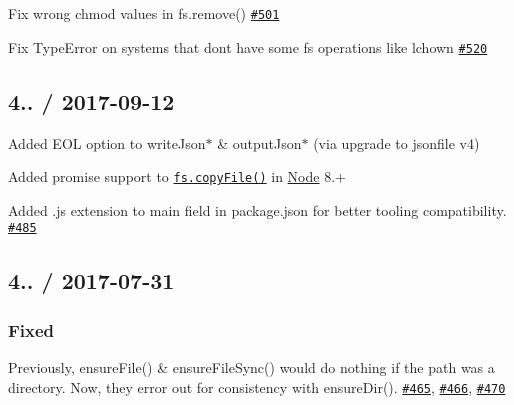 
\begin{DoxyItemize}
\item Fix wrong {\ttfamily chmod} values in {\ttfamily fs.\+remove()} \href{https://github.com/jprichardson/node-fs-extra/pull/501}{\tt \#501}
\item Fix {\ttfamily Type\+Error} on systems that don\textquotesingle{}t have some {\ttfamily fs} operations like {\ttfamily lchown} \href{https://github.com/jprichardson/node-fs-extra/pull/520}{\tt \#520}
\end{DoxyItemize}

\subsection*{4.. / 2017-\/09-\/12 }


\begin{DoxyItemize}
\item Added {\ttfamily E\+OL} option to {\ttfamily write\+Json$\ast$} \& {\ttfamily output\+Json$\ast$} (via upgrade to jsonfile v4)
\item Added promise support to \href{https://nodejs.org/api/fs.html#fs_fs_copyfile_src_dest_flags_callback}{\tt {\ttfamily fs.\+copy\+File()}} in \mbox{\hyperlink{classNode}{Node}} 8.+
\item Added {\ttfamily .js} extension to {\ttfamily main} field in {\ttfamily package.\+json} for better tooling compatibility. \href{https://github.com/jprichardson/node-fs-extra/pull/485}{\tt \#485}
\end{DoxyItemize}

\subsection*{4.. / 2017-\/07-\/31 }

\subsubsection*{Fixed}


\begin{DoxyItemize}
\item Previously, {\ttfamily ensure\+File()} \& {\ttfamily ensure\+File\+Sync()} would do nothing if the path was a directory. Now, they error out for consistency with {\ttfamily ensure\+Dir()}. \href{https://github.com/jprichardson/node-fs-extra/issues/465}{\tt \#465}, \href{https://github.com/jprichardson/node-fs-extra/pull/466}{\tt \#466}, \href{https://github.com/jprichardson/node-fs-extra/issues/470}{\tt \#470}
\end{DoxyItemize}

